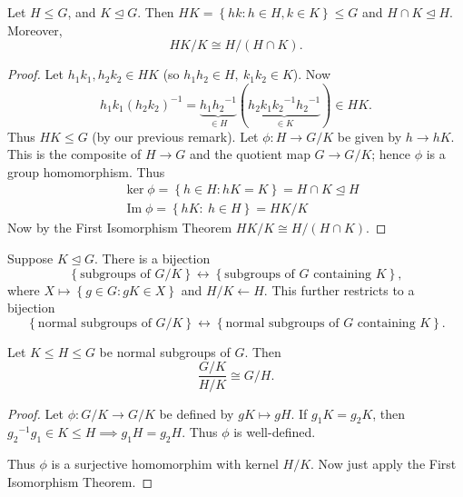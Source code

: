 \documentclass[egregdoesnotlikesansseriftitles,a4paper]{scrartcl}
\begin{document}
\begin{theorem}
      Let $H \leq G$, and $K \unlhd G$. Then $HK = \left\{hk: h \in H, k \in K\right\} \leq G$ and $H \cap K \unlhd H$. Moreover, \[
      HK/K \cong H/(H \cap K)
      .\]
      \begin{proof}
            Let $h_1 k_1 , h_2 k_2 \in HK$ (so $h_1 h_2 \in H, \ k_1 k_2 \in K$). Now \[
            h_1 k_1 {(h_2 k_2 )}^{-1}=\underbrace{h_1 {h_2 }^{-1}}_{\in H} (\underbrace{h_2 k_1 {k_2 }^{-1} {h_2 }^{-1}}_{\in K} )\in HK 
            .\] 
           Thus $HK \leq G$ (by our previous remark). Let $\phi: H \rightarrow G/K$ be given by $h \rightarrow hK$. This is the composite of $H \rightarrow G$ and the quotient map $G \rightarrow G/K$; hence $\phi$ is a group homomorphism. Thus
           \begin{align*}
                &\operatorname{ker} \phi = \left\{h \in H: hK=K\right\}=H \cap K \unlhd H \\
                &\operatorname{Im} \phi = \left\{hK: \ h \in H\right\}=HK/K
           \end{align*}
           Now by the First Isomorphism Theorem $HK/K \cong H/(H \cap K)$.
      \end{proof}
\end{theorem}
\begin{lemma}\label{1p2}
      Suppose $K \unlhd G$. There is a bijection \[
      \left\{\text{subgroups of }G/K\right\} \leftrightarrow \left\{\text{subgroups of }G \text{ containing }K\right\}
      ,\] 
     where $X \mapsto \left\{g \in G: gK \in X\right\}$ and $H/K \leftarrow H$. This further restricts to a bijection 
     \[
      \left\{\text{normal subgroups of }G/K\right\} \leftrightarrow \left\{\text{normal subgroups of }G \text{ containing }K\right\}
      .\] 
\end{lemma}
\begin{theorem}
      Let $K \leq H \leq G$ be normal subgroups of $G$. Then \[
      \frac{G/K}{H/K} \cong G/H
      .\] 
      \begin{proof}
            Let $\phi: G/K \rightarrow G/K$ be defined by $gK \mapsto gH$. If $g_1 K= g_2 K$, then ${g_2 }^{-1}g_1 \in K \leq H \implies  g_1 H= g_2 H$. Thus $\phi$ is well-defined.
            
            Thus $\phi$ is a surjective homomorphim with kernel $H/K$. Now just apply the First Isomorphism Theorem.
      \end{proof}
\end{theorem}
\newpage
\end{document}
